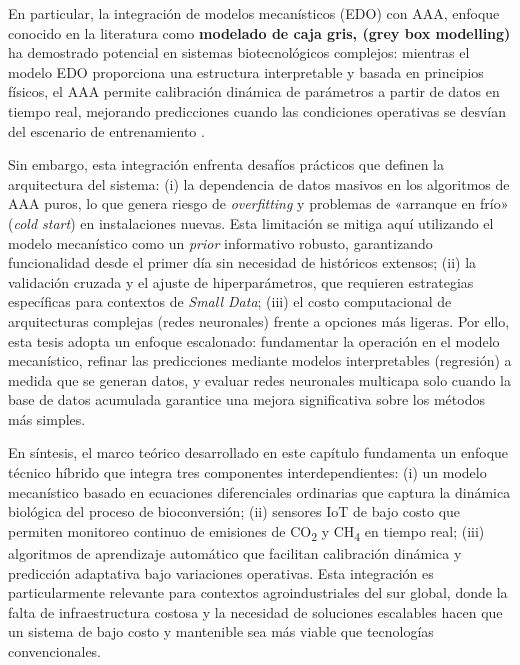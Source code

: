 En particular, la integración de modelos mecanísticos (EDO) con AAA, enfoque conocido en la literatura como \textbf{modelado de caja gris, (grey box modelling)} ha demostrado 
potencial en sistemas biotecnológicos complejos: mientras el modelo EDO proporciona 
una estructura interpretable y basada en principios físicos, el AAA permite calibración 
dinámica de parámetros a partir de datos en tiempo real, mejorando predicciones cuando 
las condiciones operativas se desvían del escenario de entrenamiento 
\parencite{kobelskiModelbasedProcessOptimization2024a,guillaumeAsymptoticEstimatedDigestibility2023}. 

Sin embargo, esta integración enfrenta desafíos prácticos que definen la arquitectura del sistema: (i) la dependencia de datos masivos en los algoritmos de AAA puros, lo que genera riesgo de \textit{overfitting} y problemas de «arranque en frío» (\textit{cold start}) en instalaciones nuevas. Esta limitación se mitiga aquí utilizando el modelo mecanístico como un \textit{prior} informativo robusto, garantizando funcionalidad desde el primer día sin necesidad de históricos extensos; (ii) la validación cruzada y el ajuste de hiperparámetros, que requieren estrategias específicas para contextos de \textit{Small Data}; (iii) el costo computacional de arquitecturas complejas (redes neuronales) frente a opciones más ligeras. Por ello, esta tesis adopta un enfoque escalonado: fundamentar la operación en el modelo mecanístico, refinar las predicciones mediante modelos interpretables (regresión) a medida que se generan datos, y evaluar redes neuronales multicapa solo cuando la base de datos acumulada garantice una mejora significativa sobre los métodos más simples.

En síntesis, el marco teórico desarrollado en este capítulo fundamenta un enfoque 
técnico híbrido que integra tres componentes interdependientes: (i) un modelo mecanístico 
basado en ecuaciones diferenciales ordinarias que captura la dinámica biológica del proceso 
de bioconversión; (ii) sensores IoT de bajo costo que permiten monitoreo continuo de emisiones 
de CO\textsubscript{2} y CH\textsubscript{4} en tiempo real; (iii) algoritmos de aprendizaje 
automático que facilitan calibración dinámica y predicción adaptativa bajo variaciones 
operativas. Esta integración es particularmente relevante para contextos agroindustriales 
del sur global, donde la falta de infraestructura costosa y la necesidad de soluciones 
escalables hacen que un sistema de bajo costo y mantenible sea más viable que tecnologías 
convencionales.

